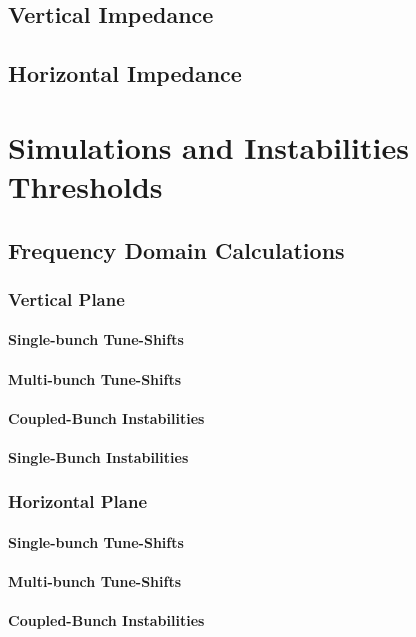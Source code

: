 \documentclass[
	12pt,				%
	openright,			%
	oneside,			%
	a4paper,		%
	chapter=TITLE,		%
	section=TITLE,		%
    brazil,				%
	english,			%
	sumario=tradicional,
	]{abntex2}
\begin{document}
    \subsection{Vertical Impedance}
    \subsection{Horizontal Impedance}
  \section{Simulations and Instabilities Thresholds}
    \subsection{Frequency Domain Calculations}
      \subsubsection{Vertical Plane}
        \paragraph{Single-bunch Tune-Shifts}
        \paragraph{Multi-bunch Tune-Shifts}
        \paragraph{Coupled-Bunch Instabilities}
        \paragraph{Single-Bunch Instabilities}
      \subsubsection{Horizontal Plane}
        \paragraph{Single-bunch Tune-Shifts}
        \paragraph{Multi-bunch Tune-Shifts}
        \paragraph{Coupled-Bunch Instabilities}
\end{document}
